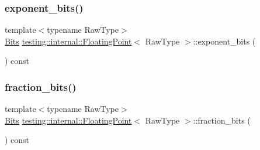 \mbox{\label{classtesting_1_1internal_1_1_floating_point_af6bf8fab8df572ecb137a3516ff390ae}} 
\subsubsection{\texorpdfstring{exponent\_bits()}{exponent\_bits()}\hspace{0.1cm}{\footnotesize\ttfamily [3/3]}}
{\footnotesize\ttfamily template$<$typename Raw\+Type$>$ \\
\mbox{\hyperlink{classtesting_1_1internal_1_1_floating_point_abf228bf6cd48f12c8b44c85b4971a731}{Bits}} \mbox{\hyperlink{classtesting_1_1internal_1_1_floating_point}{testing\+::internal\+::\+Floating\+Point}}$<$ Raw\+Type $>$\+::exponent\+\_\+bits (\begin{DoxyParamCaption}{ }\end{DoxyParamCaption}) const\hspace{0.3cm}{\ttfamily [inline]}}

\mbox{\label{classtesting_1_1internal_1_1_floating_point_aa17337e50a2ac855719bc0676529558f}} 
\subsubsection{\texorpdfstring{fraction\_bits()}{fraction\_bits()}\hspace{0.1cm}{\footnotesize\ttfamily [1/3]}}
{\footnotesize\ttfamily template$<$typename Raw\+Type$>$ \\
\mbox{\hyperlink{classtesting_1_1internal_1_1_floating_point_abf228bf6cd48f12c8b44c85b4971a731}{Bits}} \mbox{\hyperlink{classtesting_1_1internal_1_1_floating_point}{testing\+::internal\+::\+Floating\+Point}}$<$ Raw\+Type $>$\+::fraction\+\_\+bits (\begin{DoxyParamCaption}{ }\end{DoxyParamCaption}) const\hspace{0.3cm}{\ttfamily [inline]}}

